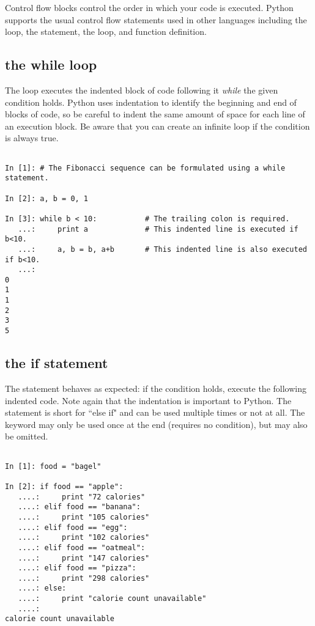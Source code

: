 Control flow blocks control the order in which your code is executed.
Python supports the usual control flow statements used in other languages
including the  loop, the  statement, the  loop, 
and function definition. 

\subsection*{the while loop}
\begin{example}

The  loop executes the indented block of code following it \emph{while} the given condition holds. Python uses indentation to identify the beginning and end of blocks of code, so be careful to indent the same amount of space for each line of an execution block.
Be aware that you can create an infinite loop if the condition is always true.

\begin{lstlisting}

In [1]: # The Fibonacci sequence can be formulated using a while statement. 

In [2]: a, b = 0, 1

In [3]: while b < 10:		    # The trailing colon is required.
   ...:     print a             # This indented line is executed if b<10.
   ...:     a, b = b, a+b       # This indented line is also executed if b<10.
   ...:     
0
1
1
2
3
5

\end{lstlisting}
\end{example}

\subsection*{the if statement}
\begin{example}

The  statement behaves as expected: if the condition holds, execute the 
following indented code. Note again that the indentation is important to Python. 
The  statement is short for ``else if" and can be used multiple times or not at all. 
The  keyword may only be used once at the end (requires no condition), 
but may also be omitted. 

\begin{lstlisting}

In [1]: food = "bagel"

In [2]: if food == "apple":
   ....:     print "72 calories"
   ....: elif food == "banana":
   ....:     print "105 calories"
   ....: elif food == "egg":
   ....:     print "102 calories"
   ....: elif food == "oatmeal":
   ....:     print "147 calories"
   ....: elif food == "pizza":
   ....:     print "298 calories"
   ....: else: 
   ....:     print "calorie count unavailable"
   ....:     
calorie count unavailable
   
\end{lstlisting}
\end{example}

